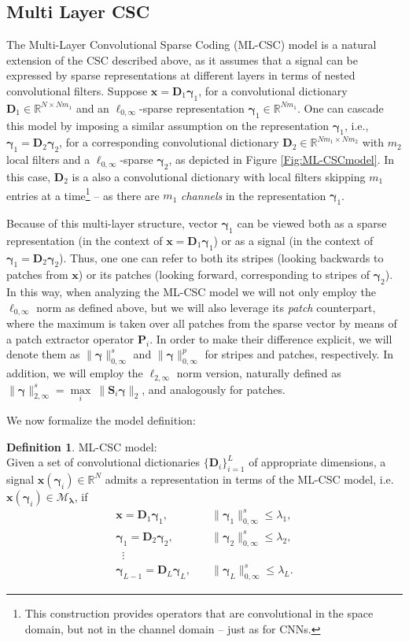 \documentclass[10pt,journal]{IEEEtran}
\def\x{{\mathbf x}}
\def\D{{\mathbf D}}
\def\M{{\mathcal{M}}}
\def\gama{{\boldsymbol \gamma}}
\def\lamda{{\boldsymbol \lambda}}
\def\Loi{{\ell_{0,\infty}}}
\theoremstyle{plain}
\theoremstyle{definition}
\newtheorem{defn}[thm]{Definition} %
\begin{document}
\subsection{Multi Layer CSC}
\label{sec:MultiLayerCSC}
The Multi-Layer Convolutional Sparse Coding (ML-CSC) model is a natural extension of the CSC described above, as it assumes that a signal can be expressed by sparse representations at different layers in terms of nested convolutional filters. Suppose $\x = \D_1\gama_1$, for a convolutional dictionary $\D_1 \in \mathbb{R}^{N\times Nm_1}$ and an $\Loi$-sparse representation $\gama_1 \in \mathbb{R}^{Nm_1}$.  One can cascade this model by imposing a similar assumption on the representation $\gama_1$, i.e., $\gama_1 = \D_2\gama_2$, for a corresponding convolutional dictionary $\D_2\in\mathbb{R}^{Nm_1\times Nm_2}$ with $m_2$ local filters and a $\Loi$-sparse $\gama_2$, as depicted in Figure \ref{Fig:ML-CSCmodel}. In this case, $\D_2$ is a also a convolutional dictionary with local filters skipping $m_1$ entries at a time\footnote{This construction provides operators that are convolutional in the space domain, but not in the channel domain -- just as for CNNs.} -- as there are $m_1$ \emph{channels} in the representation $\gama_1$. 

Because of this multi-layer structure, vector $\gama_1$ can be viewed both as a sparse representation (in the context of $\x=\D_1\gama_1$) or as a signal (in the context of $\gama_1 = \D_2\gama_2$). Thus, one one can refer to both its stripes (looking backwards to patches from $\x$) or its patches (looking forward, corresponding to stripes of $\gama_2$). In this way, when analyzing the ML-CSC model we will not only employ the $\ell_{0,\infty}$ norm as defined above, but we will also leverage its \emph{patch} counterpart, where the maximum is taken over all patches from the sparse vector by means of a patch extractor operator $\mathbf{P}_i$. In order to make their difference explicit, we will denote them as $\|\gama\|^s_{0,\infty}$ and $\|\gama\|^p_{0,\infty}$ for stripes and patches, respectively. In addition, we will employ the $\ell_{2,\infty}$ norm version, naturally defined as $\|\gama\|^s_{2,\infty} = \underset{i}{\max}\ \|\mathbf{S}_i\gama \|_2$, and analogously for patches.	

We now formalize the model definition:

\begin{defn}{ML-CSC model:}\\
Given a set of convolutional dictionaries $\{\D_i\}_{i=1}^L$ of appropriate dimensions, a signal $\x(\gama_i) \in \mathbb{R}^{N}$ admits a representation in terms of the ML-CSC model, i.e. $\x(\gama_i) \in \M_{\lamda}$, if
	\begin{align*}
	 \x = \D_1 \gama_1, &  \quad \|\gama_1\|^s_{0,\infty} \leq \lambda_1, \\
	\gama_1 = \D_2 \gama_2, & \quad \|\gama_2\|^s_{0,\infty} \leq \lambda_2 , \\
	\phantom{..} \vdots  \\
	\gama_{L-1} = \D_L \gama_L, & \quad \|\gama_L\|^s_{0,\infty} \leq \lambda_L.
	\end{align*}
\end{defn}
\end{document}
